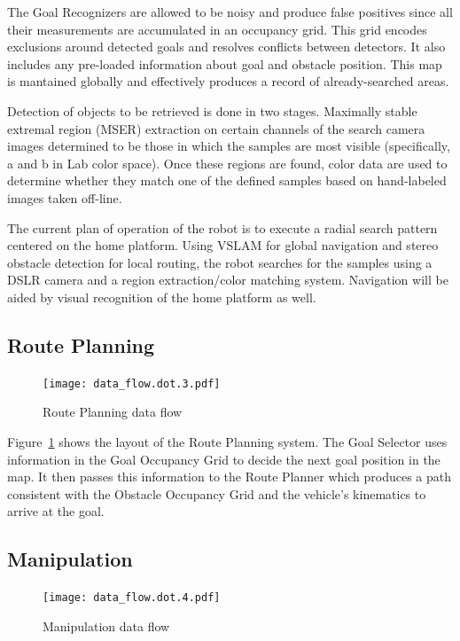 \documentclass[12pt]{article}
\begin{document}
The Goal Recognizers are allowed to be noisy and produce false positives since all their measurements are accumulated in an occupancy grid. This grid encodes exclusions around detected goals and resolves conflicts between detectors. It also includes any pre-loaded information about goal and obstacle position. This map is mantained globally and effectively produces a record of already-searched areas.

Detection of objects to be retrieved is done in two stages. Maximally stable extremal region (MSER) extraction on certain channels of the search camera images determined to be those in which the samples are most visible (specifically, a and b in Lab color space). Once these regions are found, color data are used to determine whether they match one of the defined samples based on hand-labeled images taken off-line.

The current plan of operation of the robot is to execute a radial search pattern centered on the home platform. Using VSLAM for global navigation and stereo obstacle detection for local routing, the robot searches for the samples using a DSLR camera and a region extraction/color matching system. Navigation will be aided by visual recognition of the home platform as well.\\

\subsection{Route Planning}
\begin{figure}[htbp]
\centering
\texttt{[image: data\_flow.dot.3.pdf]}
\caption{Route Planning data flow}
\label{fig_df_rp}
\end{figure}
Figure~\ref{fig_df_rp} shows the layout of the Route Planning system. The Goal Selector uses information in the Goal Occupancy Grid to decide the next goal position in the map. It then passes this information to the Route Planner which produces a path consistent with the Obstacle Occupancy Grid and the vehicle's kinematics to arrive at the goal.


\subsection{Manipulation}\label{Manipulation}
\begin{figure}[htbp]
\centering
\texttt{[image: data\_flow.dot.4.pdf]}
\caption{Manipulation data flow}
\label{fig_df_man}
\end{figure}
\end{document}
